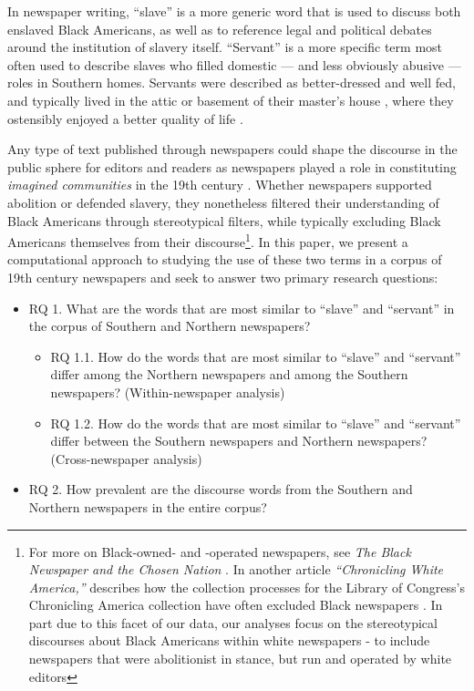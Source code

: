 \documentclass[11pt]{article}
\begin{document}
In newspaper writing, ``slave'' is a more generic word that is used to discuss both enslaved Black Americans, as well as to reference legal and political debates around the institution of slavery itself.
``Servant'' is a more specific term most often used to describe slaves who filled domestic — and less obviously abusive — roles in Southern homes. 
Servants were described as better-dressed and well fed, and typically lived in the attic or basement of their master's house \citep{malcolm1990malcolm}, where they ostensibly enjoyed a better quality of life \citep{gatewood2000aristocrats}.

Any type of text published through newspapers could shape the discourse in the public sphere for editors and readers as newspapers played a role in constituting \textit{imagined communities} in the 19th century \citep{anderson2006imagined}. 
Whether newspapers supported abolition or defended slavery, they nonetheless filtered their understanding of Black Americans through stereotypical filters, while typically excluding Black Americans themselves from their discourse\footnote{For more on Black-owned- and -operated newspapers, see \textit{The Black Newspaper and the Chosen Nation} \citep{fagan2016black}.
In another article \textit{``Chronicling White America,''} \citeauthor{fagan2016chronicling} describes how the collection processes for the Library of Congress's Chronicling America collection have often excluded Black newspapers \citep{fagan2016chronicling}. In part due to this facet of our data, our analyses focus on the stereotypical discourses about Black Americans within white newspapers - to include newspapers that were abolitionist in stance, but run and operated by white editors}. 
In this paper, we present a computational approach to studying the use of these two terms in a corpus of 19th century newspapers and seek to answer two primary research questions:

\begin{itemize}
  \item RQ 1. What are the words that are most similar to ``slave'' and ``servant'' in the corpus of Southern and Northern newspapers?
    \begin{itemize}
      \item RQ 1.1. How do the words that are most similar to ``slave'' and ``servant'' differ among the Northern newspapers and among the Southern newspapers? (Within-newspaper analysis)
      \item RQ 1.2. How do the words that are most similar to ``slave'' and ``servant'' differ between the Southern newspapers and Northern newspapers? (Cross-newspaper analysis)
    \end{itemize}
  \item RQ 2. How prevalent are the discourse words from the Southern and Northern newspapers in the entire corpus? 
\end{itemize}
\end{document}
